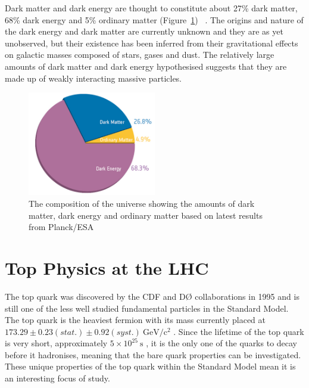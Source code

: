 Dark matter and dark energy are thought to constitute about 27\% dark matter, 68\% dark energy and 5\%
ordinary matter (Figure~\ref{fig:universe_composition}) ~\cite{Ade:2013sjv}. The origins and nature of the
dark energy and dark matter are currently unknown and they are as yet unobserved, but their existence has been
inferred from their gravitational effects on galactic masses composed of stars, gases and dust. The relatively
large amounts of dark matter and dark energy hypothesised suggests that they are made up of weakly interacting
massive particles.

\begin{figure}[hbtp]
   \centering
     \includegraphics[width=0.5\textwidth]{Chapters/02_Theory/Images/planck_cosmic_pie}\hfill
     \caption{The composition of the universe showing the amounts of dark matter, dark energy and ordinary
     matter based on latest results from Planck/ESA~\cite{Ade:2013sjv}}
     \label{fig:universe_composition}
\end{figure}


\section{Top Physics at the LHC}
\label{s:top_physics_at_the_lhc}
The top quark was discovered by the CDF and D{\O} collaborations in 1995 \cite{Abe:1995hr, Abachi:1995iq} and
is still one of the less well studied fundamental particles in the Standard Model. The top quark is the
heaviest fermion with its mass currently placed at $173.29 \pm 0.23 (stat.) \pm 0.92
(syst.)\mathrm{~GeV/c^{2}}$ \cite{top_mass}. Since the lifetime of the top quark is very short, approximately
$5 \times 10^{25}\mathrm{~s}$ \cite{Agashe:2014kda}, it is the only one of the quarks to decay before it
hadronises, meaning that the bare quark properties can be investigated. These unique properties of the top
quark within the Standard Model mean it is an interesting focus of study.

